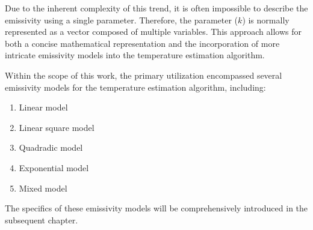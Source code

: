 Due to the inherent complexity of this trend, it is often impossible to describe 
the emissivity using a single parameter. Therefore, the parameter ($k$) is normally 
represented as a vector composed of multiple variables. This approach allows for both a 
concise mathematical representation and the incorporation of more 
intricate emissivity models into the temperature estimation algorithm.


Within the scope of this work, the primary utilization encompassed several emissivity models 
for the temperature estimation algorithm, including:

\begin{enumerate}
    \item Linear model
    \item Linear square model
    \item Quadradic model
    \item Exponential model
    \item Mixed model
\end{enumerate}


The specifics of these emissivity models will be comprehensively introduced in the subsequent chapter.
%
%
